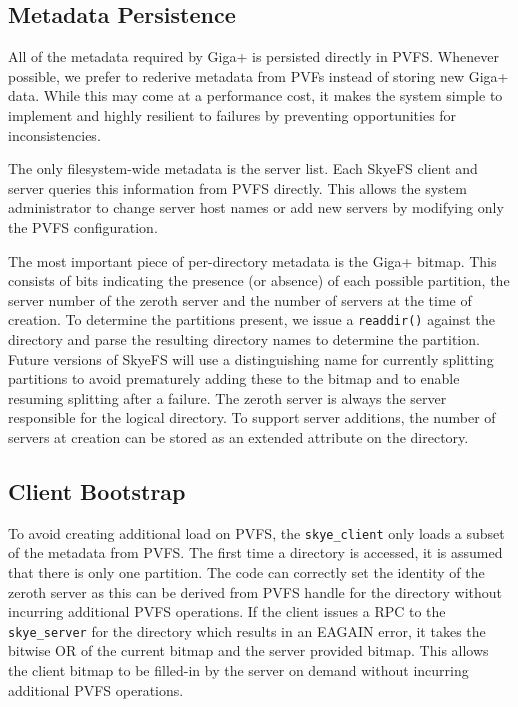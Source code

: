 \documentclass[twocolumn,letterpaper]{article}
\newcommand{\code}[1]{\texttt{#1}}
\begin{document}
\subsection{Metadata Persistence}
All of the metadata required by Giga+ is persisted directly in PVFS.  Whenever
possible, we prefer to rederive metadata from PVFs instead of storing new
Giga+ data.  While this may come at a performance cost, it makes the system
simple to implement and highly resilient to failures by preventing
opportunities for inconsistencies.

The only filesystem-wide metadata is the server list.  Each SkyeFS client and
server queries this information from PVFS directly.  This allows the system
administrator to change server host names or add new servers by modifying only
the PVFS configuration.

The most important piece of per-directory metadata is the Giga+ bitmap.  This
consists of bits indicating the presence (or absence) of each possible
partition, the server number of the zeroth server and  the number of servers
at the time of creation.  To determine the partitions present, we issue a
\code{readdir()} against the directory and parse the resulting directory names
to determine the partition.  Future versions of SkyeFS will use a
distinguishing name for currently splitting partitions to avoid prematurely
adding these to the bitmap and to enable resuming splitting after a failure.
The zeroth server is always the server responsible for the logical directory.
To support server additions, the number of servers at creation can be stored
as an extended attribute on the directory.

\subsection{Client Bootstrap}
To avoid creating additional load on PVFS, the \code{skye\_client} only loads
a subset of the metadata from PVFS.  The first time a directory is accessed,
it is assumed that there is only one partition.  The code can correctly set
the identity of the zeroth server as this can be derived from PVFS handle for
the directory without incurring additional PVFS operations.  If the client
issues a RPC to the \code{skye\_server} for the directory which results in an
EAGAIN error, it takes the bitwise OR of the current bitmap and the server
provided bitmap.  This allows the client bitmap to be filled-in by the server
on demand without incurring additional PVFS operations.
\end{document}
